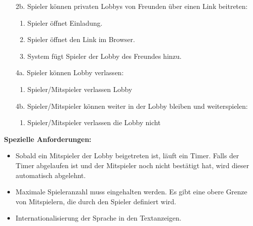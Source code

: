 \documentclass[11pt,ngerman]{article}
\begin{document}
\begin{tcolorbox}
\begin{itemize}
                    \item[2b.] Spieler können privaten Lobbys von Freunden über einen Link beitreten:
                    \begin{enumerate}
                        \item Spieler öffnet Einladung.
                        \item Spieler öffnet den Link im Browser.
                        \item System fügt Spieler der Lobby des Freundes hinzu.
                    \end{enumerate}
                    \item[4a.] Spieler können Lobby verlassen:
                    \begin{enumerate}
                        \item Spieler/Mitspieler verlassen Lobby
                    \end{enumerate}
                    \item[4b.] Spieler/Mitspieler können weiter in der Lobby bleiben und weiterspielen:
                    \begin{enumerate}
                        \item Spieler/Mitspieler verlassen die Lobby nicht
                    \end{enumerate}
                \end{itemize}
                \textbf{Spezielle Anforderungen:}
                \begin{itemize}
                    \item Sobald ein Mitspieler der Lobby beigetreten ist, läuft ein Timer. Falls der Timer abgelaufen ist und der Mitspieler noch nicht bestätigt hat, wird dieser automatisch abgelehnt.
                    \item Maximale Spieleranzahl muss eingehalten werden. Es gibt eine obere Grenze von Mitspielern, die durch den Spieler definiert wird.
                    \item Internationalisierung der Sprache in den Textanzeigen.
                \end{itemize}

            \end{tcolorbox}
\end{document}
